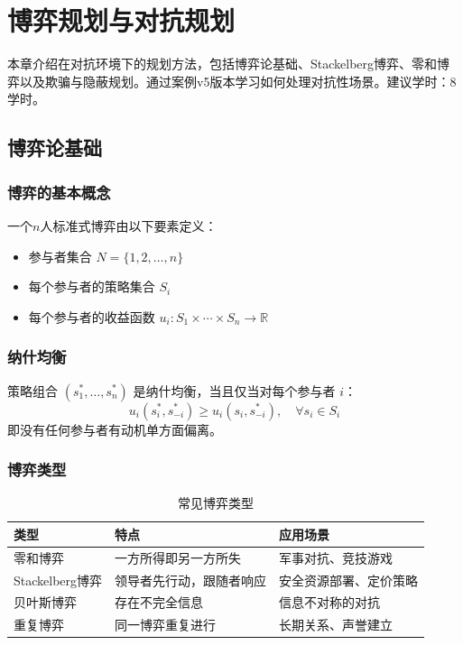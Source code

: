 \chapter{博弈规划与对抗规划}

\begin{levelbox}
本章介绍在对抗环境下的规划方法，包括博弈论基础、Stackelberg博弈、零和博弈以及欺骗与隐蔽规划。通过案例v5版本学习如何处理对抗性场景。建议学时：8学时。
\end{levelbox}

\section{博弈论基础}

\subsection{博弈的基本概念}

\begin{definition}[标准式博弈]
一个$n$人标准式博弈由以下要素定义：
\begin{itemize}
  \item 参与者集合 $N = \{1, 2, \ldots, n\}$
  \item 每个参与者的策略集合 $S_i$
  \item 每个参与者的收益函数 $u_i: S_1 \times \cdots \times S_n \rightarrow \mathbb{R}$
\end{itemize}
\end{definition}

\subsection{纳什均衡}

\begin{definition}[纳什均衡]
策略组合 $(s_1^*, \ldots, s_n^*)$ 是纳什均衡，当且仅当对每个参与者 $i$：
\[ u_i(s_i^*, s_{-i}^*) \geq u_i(s_i, s_{-i}^*), \quad \forall s_i \in S_i \]
即没有任何参与者有动机单方面偏离。
\end{definition}

\subsection{博弈类型}

\begin{table}[htbp]
\centering
\caption{常见博弈类型}
\begin{tabular}{p{3cm}p{4cm}p{5cm}}
\toprule
\textbf{类型} & \textbf{特点} & \textbf{应用场景} \\
\midrule
零和博弈 & 一方所得即另一方所失 & 军事对抗、竞技游戏 \\
Stackelberg博弈 & 领导者先行动，跟随者响应 & 安全资源部署、定价策略 \\
贝叶斯博弈 & 存在不完全信息 & 信息不对称的对抗 \\
重复博弈 & 同一博弈重复进行 & 长期关系、声誉建立 \\
\bottomrule
\end{tabular}
\end{table}


